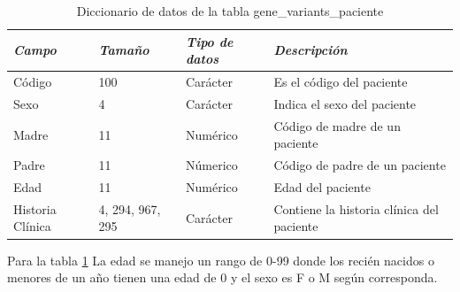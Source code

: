 \begin{table}[h!]
	\begin{tabular}{|l|l|l|p{6cm}|}
		\hline
		\textit{\textbf{Campo}} & \textit{\textbf{Tamaño}} & \textit{\textbf{Tipo de datos}} & \textit{\textbf{Descripción}}             \\ \hline
		Código                  & 100                      & Carácter                       & Es el código del paciente                 \\ \hline
		Sexo                    & 4                        & Carácter                       & Indica el sexo del paciente               \\ \hline
		Madre                   & 11                       & Numérico                       & Código de madre de un paciente            \\ \hline
		Padre                   & 11                       & Númerico                       & Código de padre de un paciente            \\ \hline
		Edad                    & 11                       & Numérico                       & Edad del paciente                         \\ \hline
		Historia Clínica        & 4, 294, 967, 295            & Carácter                       & Contiene la historia clínica del paciente \\ \hline
	\end{tabular}
\caption{Diccionario de datos de la tabla gene\_variants\_paciente}
\label{tabla:datos}
\end{table}

Para la tabla \ref{tabla:datos} La edad se manejo un rango de 0-99 donde los recién nacidos o menores de un año tienen una edad de 0 y el sexo es F o M según corresponda. 

